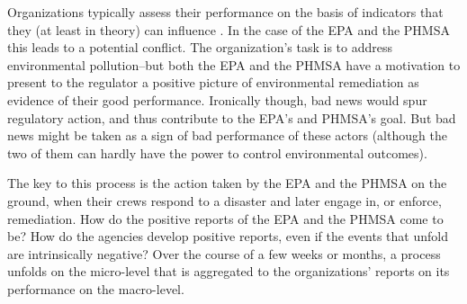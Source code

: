 \documentclass[12pt, man, natbib]{apa6}
\begin{document}
	Organizations typically assess their performance on the basis of indicators that they (at least in theory) can influence \citep{March1963}. In the case of the EPA and the PHMSA this leads to a potential conflict. The organization's task is to address environmental pollution--but both the EPA and the PHMSA have a motivation to present to the regulator a positive picture of environmental remediation as evidence of their good performance. Ironically though, bad news would spur regulatory action, and thus contribute to the EPA's and PHMSA's goal. But bad news might be taken as a sign of bad performance of these actors (although the two of them can hardly have the power to control environmental outcomes).
	
	The key to this process is the action taken by the EPA and the PHMSA on the ground, when their crews respond to a disaster and later engage in, or enforce, remediation. How do the positive reports of the EPA and the PHMSA come to be? How do the agencies develop positive reports, even if the events that unfold are intrinsically negative? Over the course of a few weeks or months, a process unfolds on the micro-level that is aggregated to the organizations' reports on its performance on the macro-level.
	

\end{document}
